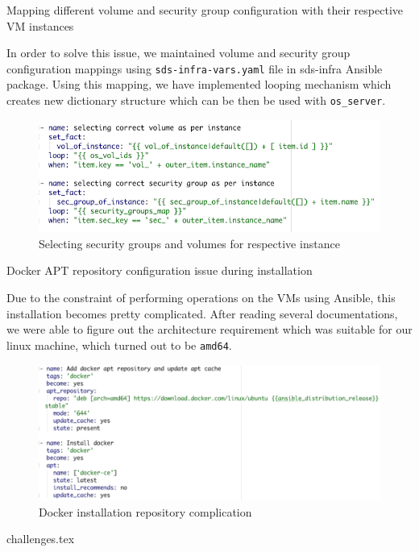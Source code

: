 \begin{flattened}

\Challenge Mapping different volume and security group configuration with their respective VM instances

\TheSolution In order to solve this issue, we maintained volume and security group configuration mappings using \texttt{sds-infra-vars.yaml} file in sds-infra Ansible package. Using this mapping, we have implemented looping mechanism which creates new dictionary structure which can be then be used with \texttt{os\_server}.

\begin{figure}[H]
    \centering
    \includegraphics[width=13cm,keepaspectratio=true]{images/deployment/create_instance.png}
    \caption{Selecting security groups and volumes for respective instance}
    \label{fig:createinstance}
\end{figure}

\Challenge Docker APT repository configuration issue during installation

\TheSolution Due to the constraint of performing operations on the VMs using Ansible, this installation becomes pretty complicated. After reading several documentations, we were able to figure out the architecture requirement which was suitable for our linux machine, which turned out to be \texttt{amd64}.

\begin{figure}[H]
    \centering
    \includegraphics[width=13cm,keepaspectratio=true]{images/deployment/docker_repo_issue.png}
    \caption{Docker installation repository complication}
    \label{fig:dockerissue}
\end{figure}

\end{flattened}

{challenges.tex}